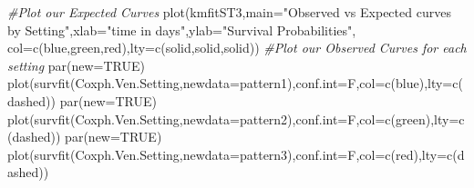 \documentclass[
]{article}
\newenvironment{Shaded}{\begin{snugshade}}{\end{snugshade}}
\newcommand{\AttributeTok}[1]{\textcolor[rgb]{0.77,0.63,0.00}{#1}}
\newcommand{\CommentTok}[1]{\textcolor[rgb]{0.56,0.35,0.01}{\textit{#1}}}
\newcommand{\ConstantTok}[1]{\textcolor[rgb]{0.00,0.00,0.00}{#1}}
\newcommand{\FunctionTok}[1]{\textcolor[rgb]{0.00,0.00,0.00}{#1}}
\newcommand{\NormalTok}[1]{#1}
\newcommand{\StringTok}[1]{\textcolor[rgb]{0.31,0.60,0.02}{#1}}
\begin{document}
\begin{Shaded}
\begin{Highlighting}[]
\CommentTok{\#Plot our Expected Curves}
\FunctionTok{plot}\NormalTok{(kmfitST3,}\AttributeTok{main=}\StringTok{"Observed vs Expected curves by Setting"}\NormalTok{,}\AttributeTok{xlab=}\StringTok{"time in days"}\NormalTok{,}\AttributeTok{ylab=}\StringTok{"Survival Probabilities"}\NormalTok{, }\AttributeTok{col=}\FunctionTok{c}\NormalTok{(}\StringTok{\textquotesingle{}blue\textquotesingle{}}\NormalTok{,}\StringTok{\textquotesingle{}green\textquotesingle{}}\NormalTok{,}\StringTok{\textquotesingle{}red\textquotesingle{}}\NormalTok{),}\AttributeTok{lty=}\FunctionTok{c}\NormalTok{(}\StringTok{\textquotesingle{}solid\textquotesingle{}}\NormalTok{,}\StringTok{\textquotesingle{}solid\textquotesingle{}}\NormalTok{,}\StringTok{\textquotesingle{}solid\textquotesingle{}}\NormalTok{))}
\CommentTok{\#Plot our Observed Curves for each setting }
\FunctionTok{par}\NormalTok{(}\AttributeTok{new=}\ConstantTok{TRUE}\NormalTok{)}
\FunctionTok{plot}\NormalTok{(}\FunctionTok{survfit}\NormalTok{(Coxph.Ven.Setting,}\AttributeTok{newdata=}\NormalTok{pattern1),}\AttributeTok{conf.int=}\NormalTok{F,}\AttributeTok{col=}\FunctionTok{c}\NormalTok{(}\StringTok{\textquotesingle{}blue\textquotesingle{}}\NormalTok{),}\AttributeTok{lty=}\FunctionTok{c}\NormalTok{(}\StringTok{\textquotesingle{}dashed\textquotesingle{}}\NormalTok{))}
\FunctionTok{par}\NormalTok{(}\AttributeTok{new=}\ConstantTok{TRUE}\NormalTok{)}
\FunctionTok{plot}\NormalTok{(}\FunctionTok{survfit}\NormalTok{(Coxph.Ven.Setting,}\AttributeTok{newdata=}\NormalTok{pattern2),}\AttributeTok{conf.int=}\NormalTok{F,}\AttributeTok{col=}\FunctionTok{c}\NormalTok{(}\StringTok{\textquotesingle{}green\textquotesingle{}}\NormalTok{),}\AttributeTok{lty=}\FunctionTok{c}\NormalTok{(}\StringTok{\textquotesingle{}dashed\textquotesingle{}}\NormalTok{))}
\FunctionTok{par}\NormalTok{(}\AttributeTok{new=}\ConstantTok{TRUE}\NormalTok{)}
\FunctionTok{plot}\NormalTok{(}\FunctionTok{survfit}\NormalTok{(Coxph.Ven.Setting,}\AttributeTok{newdata=}\NormalTok{pattern3),}\AttributeTok{conf.int=}\NormalTok{F,}\AttributeTok{col=}\FunctionTok{c}\NormalTok{(}\StringTok{\textquotesingle{}red\textquotesingle{}}\NormalTok{),}\AttributeTok{lty=}\FunctionTok{c}\NormalTok{(}\StringTok{\textquotesingle{}dashed\textquotesingle{}}\NormalTok{))}

\end{Highlighting}
\end{Shaded}
\end{document}
